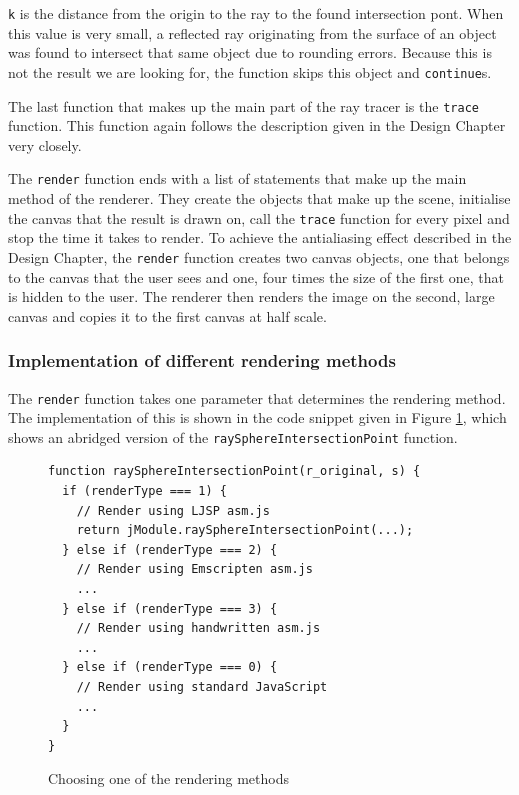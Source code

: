 \documentclass[11pt]{report}
\begin{document}
\texttt{k} is the distance from the origin to the ray to the found intersection pont. When this value is very small, a reflected ray originating from the surface of an object was found to intersect that same object due to rounding errors. Because this is not the result we are looking for, the function skips this object and \texttt{continue}s.

The last function that makes up the main part of the ray tracer is the \texttt{trace} function. This function again follows the description given in the Design Chapter very closely.

The \texttt{render} function ends with a list of statements that make up the main method of the renderer. They create the objects that make up the scene, initialise the canvas that the result is drawn on, call the \texttt{trace} function for every pixel and stop the time it takes to render. To achieve the antialiasing effect described in the Design Chapter, the \texttt{render} function creates two canvas objects, one that belongs to the canvas that the user sees and one, four times the size of the first one, that is hidden to the user. The renderer then renders the image on the second, large canvas and copies it to the first canvas at half scale. 

\subsubsection{Implementation of different rendering methods}

The \texttt{render} function takes one parameter that determines the rendering method. The implementation of this is shown in the code snippet given in Figure \ref{irenderer2}, which shows an abridged version of the \texttt{raySphere\-Intersection\-Point} function.

\begin{figure}[ht]
\begin{lstlisting}
function raySphereIntersectionPoint(r_original, s) {
  if (renderType === 1) {
    // Render using LJSP asm.js
    return jModule.raySphereIntersectionPoint(...);
  } else if (renderType === 2) {
    // Render using Emscripten asm.js
    ...
  } else if (renderType === 3) {
    // Render using handwritten asm.js
    ...
  } else if (renderType === 0) {
    // Render using standard JavaScript
    ...
  }
}
\end{lstlisting}
\caption{Choosing one of the rendering methods}
\label{irenderer2}
\end{figure}
\end{document}
